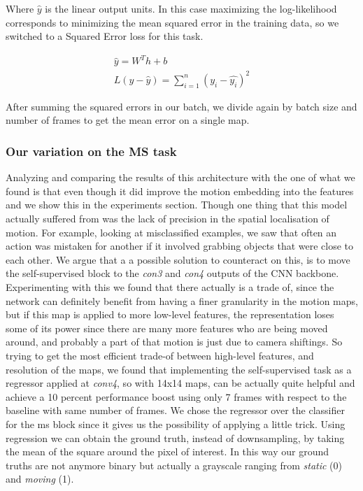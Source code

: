 \documentclass[10pt,twocolumn,hidelinks,letterpaper]{article}
\begin{document}
Where $\hat{y}$ is the linear output units. In this case maximizing the log-likelihood corresponds to minimizing the mean squared error in the training data, so we switched to a Squared Error loss for this task.

\begin{align*}
\hat{y} = W^Th + b\\
L(y - \hat{y}) = \sum_{i=1}^{n}(y_i - \hat{y_i})^2
\end{align*}

After summing the squared errors in our batch, we divide again by batch size and number of frames to get the mean error on a single map.

\subsubsection{Our variation on the MS task}

Analyzing and comparing the results of this architecture with the one of \cite{egornn} what we found is that even though it did improve the motion embedding into the features and we show this in the experiments section. Though one thing that this model actually suffered from was the lack of precision in the spatial localisation of motion. For example, looking at misclassified examples, we saw that often an action was mistaken for another if it involved grabbing objects that were close to each other. We argue that a a possible solution to counteract on this, is to move the self-supervised block to the \textit{con3} and \textit{con4} outputs of the CNN backbone. Experimenting with this we found that there actually is a trade of, since the network can definitely benefit from having a finer granularity in the motion maps, but if this map is applied to more low-level features, the representation loses some of its power since there are many more features who are being moved around, and probably a part of that motion is just due to camera shiftings. So trying to get the most efficient trade-of between high-level features, and resolution of the maps, we found that implementing the self-supervised task as a regressor applied at \textit{conv4}, so with 14x14 maps, can 
be actually quite helpful and achieve a 10 percent performance boost using only 7 frames with respect to the baseline with same number of frames.
We chose the regressor over the classifier for the ms block since it gives us the possibility of applying a little trick. Using regression we can obtain the ground truth, instead of downsampling, by taking the mean of the square around the pixel of interest. In this way our ground truths are not anymore binary but actually a grayscale ranging from \textit{static} (0) and \textit{moving} (1).
\end{document}
